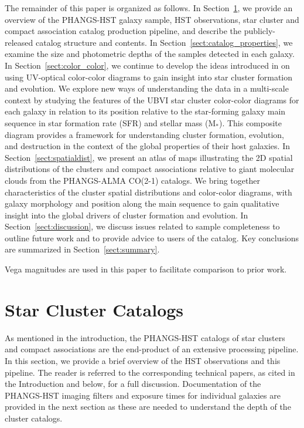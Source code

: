 \documentclass[linenumbers]{aastex63}
\begin{document}
The remainder of this paper is organized as follows. In Section~\ref{sect:catalog_content}, we provide an overview of the PHANGS-HST galaxy sample, HST observations, star cluster and compact association catalog production pipeline, and describe the publicly-released catalog structure and contents.  In Section~\ref{sect:catalog_properties}, we examine the size and photometric depths of the samples detected in each galaxy.  In Section~\ref{sect:color_color}, we continue to develop the ideas introduced in \cite{lee23ubvi} on using UV-optical color-color diagrams to gain insight into star cluster formation and evolution.  We explore new ways of understanding the data in a multi-scale context by studying the features of the UBVI star cluster color-color diagrams for each galaxy in relation to its position relative to the star-forming galaxy main sequence in star formation rate (SFR) and stellar mass (M$_*$).  This composite diagram provides a framework for understanding cluster formation, evolution, and destruction in the context of the global properties of their host galaxies.  In Section~\ref{sect:spatialdist}, we present an atlas of maps illustrating the 2D spatial distributions of the clusters and compact associations relative to giant molecular clouds from the PHANGS-ALMA CO(2-1) catalogs.  We bring together characteristics of the cluster spatial distributions and color-color diagrams, with galaxy morphology and position along the main sequence to gain qualitative insight into the global drivers of cluster formation and evolution.  In Section~\ref{sect:discussion}, we discuss issues related to sample completeness to outline future work and to provide advice to users of the catalog.  Key conclusions are summarized in Section~\ref{sect:summary}.

Vega magnitudes are used in this paper to facilitate comparison to prior work.

\section{Star Cluster Catalogs}\label{sect:catalog_content}
As mentioned in the introduction, the PHANGS-HST catalogs of star clusters and compact associations are the end-product of an extensive processing pipeline.  In this section, we provide a brief overview of the HST observations and this pipeline.  The reader is referred to the corresponding technical papers, as cited in the Introduction and below, for a full discussion.  Documentation of the PHANGS-HST imaging filters and exposure times for individual galaxies are provided in the next section as these are needed to understand the depth of the cluster catalogs.  
\end{document}
